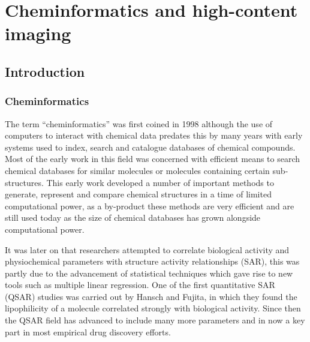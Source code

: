 \documentclass[a4paper,11pt,twoside,openright]{scrbook}
\begin{document}
\chapter{Cheminformatics and high-content imaging} \label{chapter:cheminformatics}

\section{Introduction}

\subsection{Cheminformatics}

The term ``cheminformatics'' was first coined in 1998\cite{Brown1998} although the use of computers to interact with 
chemical data predates this by many years with early systems used to index, search and catalogue databases of chemical 
compounds. \cite{Ray1957}
Most of the early work in this field was concerned with efficient means to search chemical databases for similar 
molecules or molecules containing certain sub-structures.
This early work developed a number of important methods to generate, represent and compare chemical structures in a 
time of limited computational power, as a by-product these methods are very efficient and are still used today as the 
size of chemical databases has grown alongside computational power.

It was later on that researchers attempted to correlate biological activity and physiochemical parameters with 
structure activity relationships (SAR), this was partly due to the advancement of statistical techniques which gave 
rise to new tools such as multiple linear regression.
One of the first quantitative SAR (QSAR) studies was carried out by Hansch and Fujita, in which they found the 
lipophilicity of a molecule correlated strongly with biological activity. \cite{Hansch1962}
Since then the QSAR field has advanced to include many more parameters and in now a key part in most empirical drug 
discovery efforts.
\end{document}
